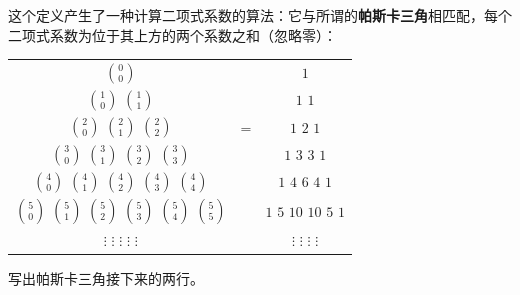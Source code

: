 这个定义产生了一种计算二项式系数的算法：它与所谓的\textbf{帕斯卡三角}相匹配，每个二项式系数为位于其上方的两个系数之和（忽略零）：

\begin{center}\begin{tabular}{ccc}
$\binom{0}{0}$ && $1$ \\
$\binom{1}{0}$ \quad $\binom{1}{1}$ && $1$ \quad $1$ \\
$\binom{2}{0}$ \quad $\binom{2}{1}$ \quad $\binom{2}{2}$ & = & $1$ \quad $2$ \quad $1$ \\
$\binom{3}{0}$ \quad $\binom{3}{1}$ \quad $\binom{3}{2}$ \quad $\binom{3}{3}$ && $1$ \quad $3$ \quad $3$ \quad $1$ \\
$\binom{4}{0}$ \quad $\binom{4}{1}$ \quad $\binom{4}{2}$ \quad $\binom{4}{3}$ \quad $\binom{4}{4}$ && $1$ \quad $4$ \quad $6$ \quad $4$ \quad $1$ \\
$\binom{5}{0}$ \quad $\binom{5}{1}$ \quad $\binom{5}{2}$ \quad $\binom{5}{3}$ \quad $\binom{5}{4}$ \quad $\binom{5}{5}$ && $1$ \quad $5$ \quad $10$ \quad $10$ \quad $5$ \quad $1$ \\
$\vdots$ \qquad $\vdots$ \qquad $\vdots$ \qquad $\vdots$ \qquad $\vdots$ && $\vdots$ \qquad $\vdots$ \qquad $\vdots$ \qquad $\vdots$
\end{tabular}\end{center}

\begin{exercise}
写出帕斯卡三角接下来的两行。
\end{exercise}